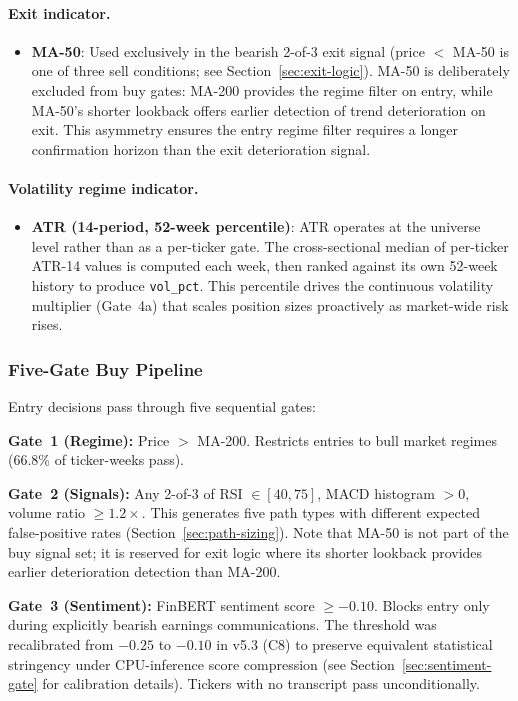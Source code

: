 \documentclass[11pt,twoside,a4paper]{article}
\begin{document}
\paragraph{Exit indicator.}
\begin{itemize}
    \item \textbf{MA-50}: Used exclusively in the bearish 2-of-3 exit signal (price $<$ MA-50 is one of three sell conditions; see Section~\ref{sec:exit-logic}). MA-50 is deliberately excluded from buy gates: MA-200 provides the regime filter on entry, while MA-50's shorter lookback offers earlier detection of trend deterioration on exit. This asymmetry ensures the entry regime filter requires a longer confirmation horizon than the exit deterioration signal.
\end{itemize}

\paragraph{Volatility regime indicator.}
\begin{itemize}
    \item \textbf{ATR (14-period, 52-week percentile)}: ATR operates at the universe level rather than as a per-ticker gate. The cross-sectional median of per-ticker ATR-14 values is computed each week, then ranked against its own 52-week history to produce \texttt{vol\_pct}. This percentile drives the continuous volatility multiplier (Gate~4a) that scales position sizes proactively as market-wide risk rises.
\end{itemize}

\subsubsection{Five-Gate Buy Pipeline}

Entry decisions pass through five sequential gates:

\textbf{Gate~1 (Regime):} Price $>$ MA-200. Restricts entries to bull market regimes (66.8\% of ticker-weeks pass).

\textbf{Gate~2 (Signals):} Any 2-of-3 of RSI $\in [40, 75]$, MACD histogram $> 0$, volume ratio $\geq 1.2\times$. This generates five path types with different expected false-positive rates (Section~\ref{sec:path-sizing}). Note that MA-50 is not part of the buy signal set; it is reserved for exit logic where its shorter lookback provides earlier deterioration detection than MA-200.

\textbf{Gate~3 (Sentiment):} FinBERT sentiment score $\geq -0.10$. Blocks entry only during explicitly bearish earnings communications. The threshold was recalibrated from $-0.25$ to $-0.10$ in v5.3 (C8) to preserve equivalent statistical stringency under CPU-inference score compression (see Section~\ref{sec:sentiment-gate} for calibration details). Tickers with no transcript pass unconditionally.
\end{document}
